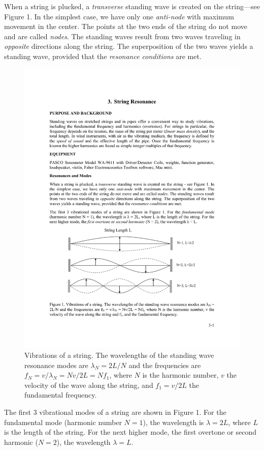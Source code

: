 \documentclass[11pt]{NSF}
\begin{document}
When a string is plucked, a {\em transverse} standing wave is 
created on the string---see Figure 1. 
In the simplest case, we have only one {\em anti-node} with maximum
movement in the center. The points at the two ends of the string do not move
and are called {\em nodes}. 
The standing waves result from two waves traveling in {\em opposite}
directions along the string. The superposition of the two waves yields
a standing wave, provided that the {\em resonance conditions} are met.
%
\begin{figure}[hbtp]
\begin{center}
\includegraphics[width=.85\textwidth]{fig3_1}
\caption{Vibrations of a string. The wavelengths of the standing wave resonance
modes are $\lambda_N = 2L/N$ and the frequencies are 
$f_N = v/\lambda_N = Nv/2L = N f_1$, where $N$ is
the harmonic number, $v$ the velocity of the wave along the string,
and $f_1=v/2L$ the fundamental frequency.} 
\label{f:1} 
\end{center} 
\end{figure}
%

The first 3 vibrational modes of a string are shown in Figure 1. For the
fundamental mode (harmonic number $N = 1$), the wavelength is 
$\lambda = 2L$, where $L$ is the length of the string. 
For the next higher mode, the first overtone or
second harmonic ($N = 2$), the wavelength $\lambda = L$.
\end{document}
